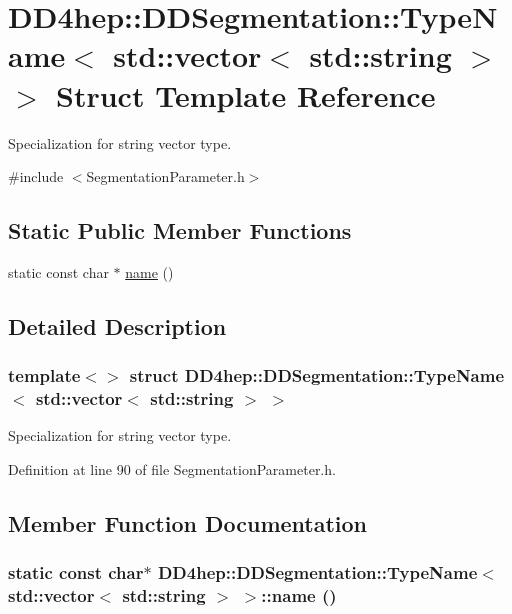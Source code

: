 \hypertarget{struct_d_d4hep_1_1_d_d_segmentation_1_1_type_name_3_01std_1_1vector_3_01std_1_1string_01_4_01_4}{
\section{DD4hep::DDSegmentation::TypeName$<$ std::vector$<$ std::string $>$ $>$ Struct Template Reference}
\label{struct_d_d4hep_1_1_d_d_segmentation_1_1_type_name_3_01std_1_1vector_3_01std_1_1string_01_4_01_4}
}


Specialization for string vector type.  


{\ttfamily \#include $<$SegmentationParameter.h$>$}\subsection*{Static Public Member Functions}
\begin{DoxyCompactItemize}
\item 
static const char $\ast$ \hyperlink{struct_d_d4hep_1_1_d_d_segmentation_1_1_type_name_3_01std_1_1vector_3_01std_1_1string_01_4_01_4_a7e4aef1131e525dddbb008626edb07fc}{name} ()
\end{DoxyCompactItemize}


\subsection{Detailed Description}
\subsubsection*{template$<$$>$ struct DD4hep::DDSegmentation::TypeName$<$ std::vector$<$ std::string $>$ $>$}

Specialization for string vector type. 

Definition at line 90 of file SegmentationParameter.h.

\subsection{Member Function Documentation}
\hypertarget{struct_d_d4hep_1_1_d_d_segmentation_1_1_type_name_3_01std_1_1vector_3_01std_1_1string_01_4_01_4_a7e4aef1131e525dddbb008626edb07fc}{
\subsubsection[{name}]{\setlength{\rightskip}{0pt plus 5cm}static const char$\ast$ {\bf DD4hep::DDSegmentation::TypeName}$<$ std::vector$<$ std::string $>$ $>$::name ()}}
\label{struct_d_d4hep_1_1_d_d_segmentation_1_1_type_name_3_01std_1_1vector_3_01std_1_1string_01_4_01_4_a7e4aef1131e525dddbb008626edb07fc}


